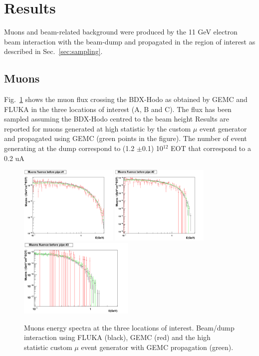 \section{Results}\label{sec:results}

Muons and beam-related background  were produced by the 11 GeV electron beam interaction with the beam-dump and propagated in the region of interest as described in  Sec.~\ref{sec:sampling}.



\subsection{Muons}
Fig.~\ref{fig:mu-comp} shows the muon flux crossing the BDX-Hodo  as obtained by GEMC and FLUKA  in the  three locations of interest (A, B and C).
The flux has been sampled assuming the BDX-Hodo centred  to the beam height  Results are reported for muons generated at high statistic by the custom $\mu$ event generator and propagated using GEMC (green points in the figure).
The number of event generating at the dump correspond to  (1.2 $\pm$0.1) 10$^{12}$ EOT that correspond to a  0.2 uA 
\begin{figure}[h!] 
\center
\includegraphics[width=4.7cm]{figs/comparisonMuonsPipe1_1D.pdf}
\includegraphics[width=4.7cm]{figs/comparisonMuonsPipe2_1D.pdf}
\includegraphics[width=5.5cm]{figs/comparisonMuonsPipe3_1D.pdf}
\caption{Muons energy spectra at the three locations of interest. Beam/dump interaction using  FLUKA (black), GEMC (red) and the high statistic custom $\mu$ event generator with GEMC propagation (green).}
\label{fig:mu-comp}
\end{figure}

